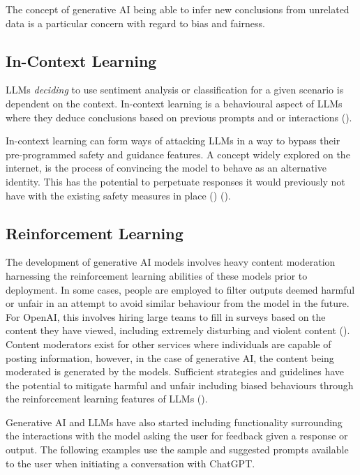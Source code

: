 \documentclass[12pt]{article}
\begin{document}
The concept of generative AI being able to infer new conclusions from unrelated data is a particular concern with regard to bias and fairness. 

\subsection{In-Context Learning}

LLMs \textit{deciding} to use sentiment analysis or classification for a given scenario is dependent on the context. In-context learning is a behavioural aspect of LLMs where they deduce conclusions based on previous prompts and or interactions (\cite{xie-2021}). 

 In-context learning can form ways of attacking LLMs in a way to bypass their pre-programmed safety and guidance features. A concept widely explored on the internet, is the process of convincing the model to behave as an alternative identity. This has the potential to perpetuate responses it would previously not have with the existing safety measures in place (\cite{wankhede-2023}) (\cite{derner-2023}). 

\subsection{Reinforcement Learning}

The development of generative AI models involves heavy content moderation harnessing the reinforcement learning abilities of these models prior to deployment. In some cases, people are employed to filter outputs deemed harmful or unfair in an attempt to avoid similar behaviour from the model in the future. For OpenAI, this involves hiring large teams to fill in surveys based on the content they have viewed, including extremely disturbing and violent content (\cite{row-2023}). Content moderators exist for other services where individuals are capable of posting information, however, in the case of generative AI, the content being moderated is generated by the models. Sufficient strategies and guidelines have the potential to mitigate harmful and unfair including biased behaviours through the reinforcement learning features of LLMs (\cite{hao-2023}).

Generative AI and LLMs have also started including functionality surrounding the interactions with the model asking the user for feedback given a response or output. The following examples use the sample and suggested prompts available to the user when initiating a conversation with ChatGPT.
\end{document}
